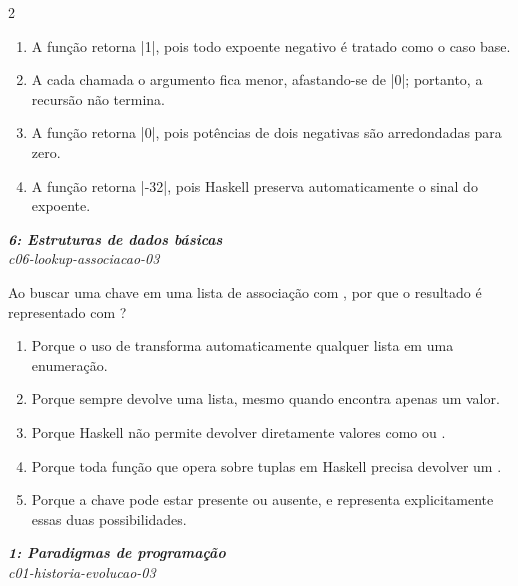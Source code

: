 \documentclass[a4paper,10pt,brazil]{article}
\begin{document}
\begin{multicols}{2}
\begin{enumerate}
  \item A função retorna \haskellinline|1|, pois todo expoente negativo é tratado como o caso base.

  \item A cada chamada o argumento fica menor, afastando-se de \haskellinline|0|; portanto, a recursão não termina.

  \item A função retorna \haskellinline|0|, pois potências de dois negativas são arredondadas para zero.

  \item A função retorna \haskellinline|-32|, pois Haskell preserva automaticamente o sinal do expoente.


\end{enumerate}

\begin{flushright}
  \footnotesize
  \textit{\textbf{6: Estruturas de dados básicas}}\\
  \textit{c06-lookup-associacao-03}\\

\end{flushright}
Ao buscar uma chave em uma lista de associação com , por que o resultado é representado com ?

\begin{enumerate}
  \item Porque o uso de  transforma automaticamente qualquer lista em uma enumeração.

  \item Porque  sempre devolve uma lista, mesmo quando encontra apenas um valor.

  \item Porque Haskell não permite devolver diretamente valores como  ou .

  \item Porque toda função que opera sobre tuplas em Haskell precisa devolver um .

  \item Porque a chave pode estar presente ou ausente, e  representa explicitamente essas duas possibilidades.


\end{enumerate}

\begin{flushright}
  \footnotesize
  \textit{\textbf{1: Paradigmas de programação}}\\
  \textit{c01-historia-evolucao-03}\\


\end{flushright}
\end{multicols}
\end{document}
